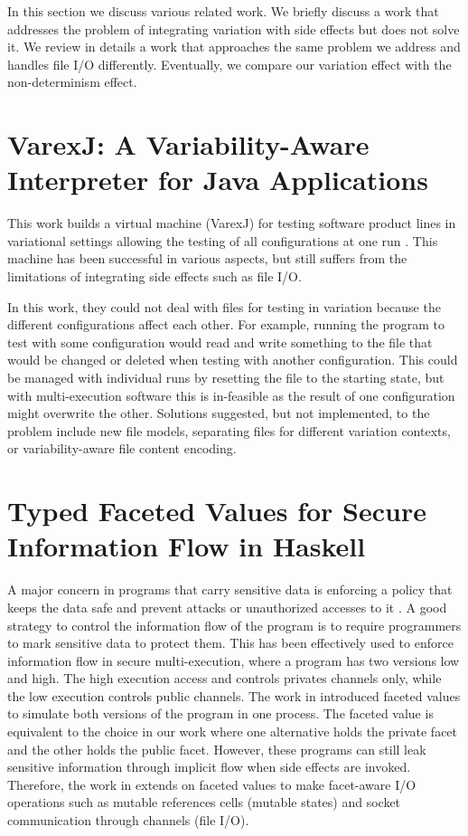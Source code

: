 In this section we discuss various related work. We briefly discuss a work that addresses the problem of integrating variation with side effects but does not solve it. We review in details a work that approaches the same problem we address and handles file I/O differently. Eventually, we compare our variation effect with the non-determinism effect. 

\section{VarexJ: A Variability-Aware Interpreter for Java Applications}

This work builds a virtual machine (VarexJ) for testing software product lines in variational settings allowing the testing of all configurations at one run \cite{Mein14:MS}. This machine has been successful in various aspects, but still suffers from the limitations of integrating side effects such as file I/O. 

In this work, they could not deal with files for testing in variation because the different configurations affect each other. For example, running the program to test with some configuration would read and write something to the file that would be changed or deleted when testing with another configuration. This could be managed with individual runs by resetting the file to the starting state, but with multi-execution software this is in-feasible as the result of one configuration might overwrite the other. Solutions suggested, but not implemented, to the problem include new file models, separating files for different variation contexts, or variability-aware file content encoding. 

\section{Typed Faceted Values for Secure Information Flow in Haskell}
\label{related_work2}
A major concern in programs that carry sensitive data is enforcing a policy that keeps the data safe and prevent attacks or unauthorized accesses to it \cite{Austin14,AF:POPL12}. A good strategy to control the information flow of the program is to require programmers to mark sensitive data to protect them. This has been effectively used to enforce information flow in secure multi-execution, where a program has two versions low and high. The high execution access and controls privates channels only, while the low execution controls public channels. The work in \cite{AF:POPL12} introduced faceted values to simulate both versions of the program in one process. The faceted value is equivalent to the choice in our work where one alternative holds the private facet and the other holds the public facet. However, these programs can still leak sensitive information through implicit flow when side effects are invoked. Therefore, the work in \cite{Austin14} extends on faceted values to make facet-aware I/O operations such as mutable references cells (mutable states) and socket communication through channels (file I/O).

